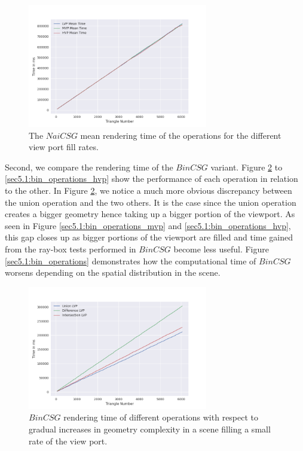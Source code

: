 \documentclass[a4paper,11pt,oneside]{article}
\begin{document}
\begin{figure}[H]
	\centering
	\includegraphics[width=0.7\textwidth]{section5/plots/naive_csg_mean.png}
	\caption{The $NaiCSG$ mean rendering time of the operations for the different view port fill rates.}
	\label{sec5.1:naive_operations}
\end{figure}

Second, we compare the rendering time of the $BinCSG$ variant. Figure \ref{sec5.1:bin_operations_lvp} to \ref{sec5.1:bin_operations_hvp} show the performance of each operation in relation to the other. In Figure \ref{sec5.1:bin_operations_lvp}, we notice a much more obvious discrepancy between the union operation and the two others. It is the case since the union operation creates a bigger geometry hence taking up a bigger portion of the viewport. As seen in Figure \ref{sec5.1:bin_operations_mvp} and \ref{sec5.1:bin_operations_hvp}, this gap closes up as bigger portions of the viewport are filled and time gained from the ray-box tests performed in $BinCSG$ become less useful. Figure \ref{sec5.1:bin_operations} demonstrates how the computational time of $BinCSG$ worsens depending on the spatial distribution in the scene.


\begin{figure}[H]
	\centering
	\includegraphics[width=0.7\textwidth]{section5/plots/bin_csg_lvp.png}
	\caption{$BinCSG$ rendering time of different operations with respect to gradual increases in geometry complexity in a scene filling a small rate of the view port.}
	\label{sec5.1:bin_operations_lvp}
\end{figure}
\end{document}
